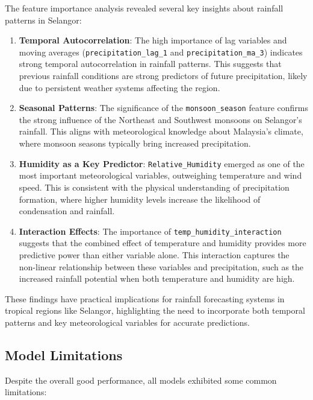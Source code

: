 \documentclass[12pt]{article}
\begin{document}
The feature importance analysis revealed several key insights about rainfall patterns in Selangor:

\begin{enumerate}
    \item \textbf{Temporal Autocorrelation}: The high importance of lag variables and moving averages (\texttt{precipitation\_lag\_1} and \texttt{precipitation\_ma\_3}) indicates strong temporal autocorrelation in rainfall patterns. This suggests that previous rainfall conditions are strong predictors of future precipitation, likely due to persistent weather systems affecting the region.
    
    \item \textbf{Seasonal Patterns}: The significance of the \texttt{monsoon\_season} feature confirms the strong influence of the Northeast and Southwest monsoons on Selangor's rainfall. This aligns with meteorological knowledge about Malaysia's climate, where monsoon seasons typically bring increased precipitation.
    
    \item \textbf{Humidity as a Key Predictor}: \texttt{Relative\_Humidity} emerged as one of the most important meteorological variables, outweighing temperature and wind speed. This is consistent with the physical understanding of precipitation formation, where higher humidity levels increase the likelihood of condensation and rainfall.
    
    \item \textbf{Interaction Effects}: The importance of \texttt{temp\_humidity\_interaction} suggests that the combined effect of temperature and humidity provides more predictive power than either variable alone. This interaction captures the non-linear relationship between these variables and precipitation, such as the increased rainfall potential when both temperature and humidity are high.
\end{enumerate}

These findings have practical implications for rainfall forecasting systems in tropical regions like Selangor, highlighting the need to incorporate both temporal patterns and key meteorological variables for accurate predictions.

\subsection{Model Limitations}
\label{subsec:model_limitations}

Despite the overall good performance, all models exhibited some common limitations:
\end{document}
